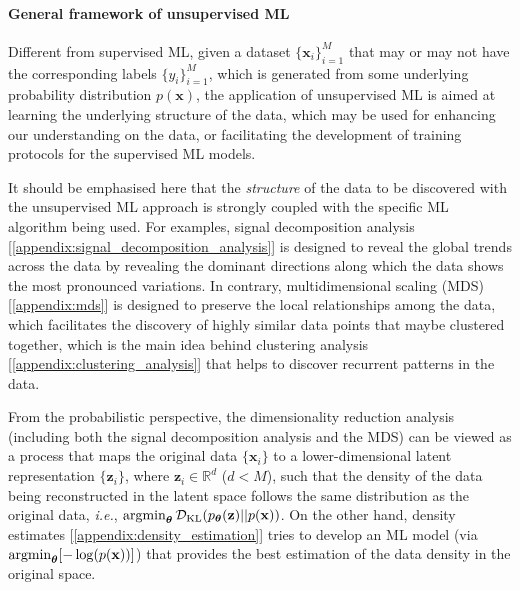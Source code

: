 \paragraph{\textbf{General framework of unsupervised ML}}

Different from supervised ML, given a dataset $\{\bm{x}_i\}_{i=1}^{M}$ that may or may not have the corresponding labels $\{y_i\}_{i=1}^{M}$, which is generated from some underlying probability distribution $p(\bm{x})$, the application of unsupervised ML is aimed at learning the underlying structure of the data, which may be used for enhancing our understanding on the data, or facilitating the development of training protocols for the supervised ML models. 

It should be emphasised here that the \emph{structure} of the data to be discovered with the unsupervised ML approach is strongly coupled with the specific ML algorithm being used. For examples, signal decomposition analysis [\cref{appendix:signal_decomposition_analysis}] is designed to reveal the global trends across the data by revealing the dominant directions along which the data shows the most pronounced variations. In contrary, multidimensional scaling (MDS) [\cref{appendix:mds}] is designed to preserve the local relationships among the data, which facilitates the discovery of highly similar data points that maybe clustered together, which is the main idea behind clustering analysis [\cref{appendix:clustering_analysis}] that helps to discover recurrent patterns in the data. 

From the probabilistic perspective, the dimensionality reduction analysis (including both the signal decomposition analysis and the MDS) can be viewed as a process that maps the original data $\{\bm{x}_i\}$ to a lower-dimensional latent representation $\{\bm{z}_i\}$, where $\bm{z}_i \in \mathbb{R}^d$ ($d<M$), such that the density of the data being reconstructed in the latent space follows the same distribution as the original data, \emph{i.e.}, $\operatorname*{argmin}_{\boldsymbol{\theta}}\mathcal{D}_{\mathrm{KL}}(p_{\boldsymbol{\theta}}(\mathbf{z})||p(\mathbf{x}))$. On the other hand, density estimates [\cref{appendix:density_estimation}] tries to develop an ML model (via $\operatorname*{argmin}_{\boldsymbol{\theta}}[-\log (p(\mathbf{x}))]$) that provides the best estimation of the data density in the original space. 

